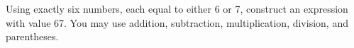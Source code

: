 Using exactly six numbers, each equal to either 6 or 7, construct an expression with value 67. You may use addition, subtraction, multiplication, division, and parentheses.
